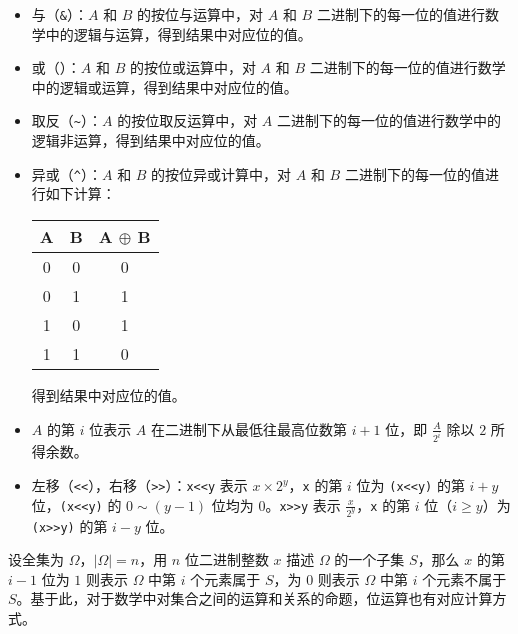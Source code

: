 \begin{itemize}
\item
  与（\texttt{\&}）：\(A\) 和 \(B\) 的按位与运算中，对 \(A\) 和 \(B\)
  二进制下的每一位的值进行数学中的逻辑与运算，得到结果中对应位的值。
\item
  或（\texttt{\textbar{}}）：\(A\) 和 \(B\) 的按位或运算中，对 \(A\) 和
  \(B\)
  二进制下的每一位的值进行数学中的逻辑或运算，得到结果中对应位的值。
\item
  取反（\texttt{\textasciitilde{}}）：\(A\) 的按位取反运算中，对 \(A\)
  二进制下的每一位的值进行数学中的逻辑非运算，得到结果中对应位的值。
\item
  异或（\texttt{\^{}}）：\(A\) 和 \(B\) 的按位异或计算中，对 \(A\) 和
  \(B\) 二进制下的每一位的值进行如下计算：


  \begin{longtable}[]{@{}ccc@{}}
  \toprule
  A & B & A \(\oplus\) B \\
  \midrule
  \endhead
  0 & 0 & 0 \\
  0 & 1 & 1 \\
  1 & 0 & 1 \\
  1 & 1 & 0 \\
  \bottomrule
  \end{longtable}

  得到结果中对应位的值。
\item
  \(A\) 的第 \(i\) 位表示 \(A\) 在二进制下从最低往最高位数第 \(i+1\)
  位，即 \(\frac{A}{2^i}\) 除以 \(2\) 所得余数。
\item
  左移（\texttt{\textless{}\textless{}}），右移（\texttt{\textgreater{}\textgreater{}}）：\texttt{x\textless{}\textless{}y}
  表示 \(x\times 2^y\)，\texttt{x} 的第 \(i\) 位为
  \texttt{(x\textless{}\textless{}y)} 的第 \(i+y\)
  位，\texttt{(x\textless{}\textless{}y)} 的 \(0\sim (y-1)\) 位均为
  \(0\)。\texttt{x\textgreater{}\textgreater{}y} 表示
  \(\frac{x}{2^y}\)，\texttt{x} 的第 \(i\) 位（\(i\ge y\)）为
  \texttt{(x\textgreater{}\textgreater{}y)} 的第 \(i-y\) 位。
\end{itemize}

设全集为 \(\Omega\)，\(|\Omega|=n\)，用 \(n\) 位二进制整数 \(x\) 描述
\(\Omega\) 的一个子集 \(S\)，那么 \(x\) 的第 \(i-1\) 位为 \(1\) 则表示
\(\Omega\) 中第 \(i\) 个元素属于 \(S\)，为 \(0\) 则表示 \(\Omega\) 中第
\(i\) 个元素不属于
\(S\)。基于此，对于数学中对集合之间的运算和关系的命题，位运算也有对应计算方式。

